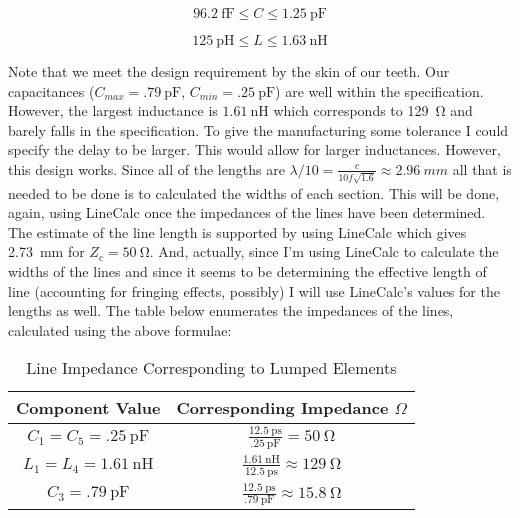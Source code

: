     \[ 
        \SI{96.2}{\femto\farad} \le C \le \SI{1.25}{\pico\farad} 
    \]
    
    \[ 
        \SI{125}{\pico\henry} \le L \le \SI{1.63}{\nano\henry}  
    \]
    
    Note that we meet the design requirement by the skin of our teeth. Our
    capacitances ($ C_{max} = \SI{.79}{\pico\farad} $, $ C_{min} =
    \SI{.25}{\pico\farad}  $) are well within the specification. However, the
    largest inductance is $\SI{1.61}{\nano\henry} $ which corresponds to
    \SI{129}{\ohm} and barely falls in the specification. To give the
    manufacturing some tolerance I could specify the delay to be larger. This
    would allow for larger inductances. However, this design works. Since all of
    the lengths are $\lambda/10 = \frac{c}{10 f \sqrt{1.6} } \approx
    \SI{2.96}{mm} $ all that is needed to be done is to calculated the widths of
    each section. This will be done, again, using LineCalc once the impedances
    of the lines have been determined. The estimate of the line length is
    supported by using LineCalc which gives \SI{2.73}{\milli\meter} for $Z_c =
    \SI{50}{\ohm} $. And, actually, since I'm using LineCalc to calculate the
    widths of the lines and since it seems to be determining the effective
    length of line (accounting for fringing effects, possibly) I will use
    LineCalc's values for the lengths as well. The table below enumerates the
    impedances of the lines, calculated using the above formulae:

    \begin{table}[h]
        \centering
        \caption{Line Impedance Corresponding to Lumped Elements}
        \label{tab:1b_line_impedance_of_lumped_elements}
        \begin{tabular}{|c|c|}
            \hline Component Value & Corresponding Impedance $ \Omega $ \\
            \hline $C_1 = C_5 = \SI{.25}{\pico\farad} $ &
            $\frac{\SI{12.5}{\pico\second}}{\SI{.25}{\pico\farad}} =
            \SI{50}{\ohm}$ \\
            \hline $L_1 = L_4 = \SI{1.61}{\nano\henry}$ &
            $\frac{\SI{1.61}{\nano\henry}}{\SI{12.5}{\pico\second}} \approx
            \SI{129}{\ohm}$  \\
            \hline $ C_3 =  \SI{.79}{\pico\farad} $ &
            $\frac{\SI{12.5}{\pico\second}}{\SI{.79}{\pico\farad}} \approx
            \SI{15.8}{\ohm} $ \\
            \hline
        \end{tabular}
    \end{table}

